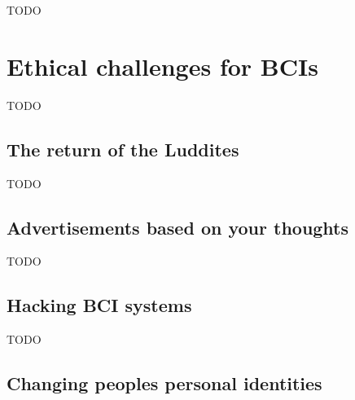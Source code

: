 TODO



\section{Ethical challenges for BCIs}
\label{sec:bci_ethical}

TODO


\subsection{The return of the Luddites}
\label{subsec:bci_ethical_luddites}

TODO


\subsection{Advertisements based on your thoughts}
\label{subsec:bci_ethical_data_mining}

TODO


\subsection{Hacking BCI systems}
\label{subsec:bci_ethical_hacking}

TODO


\subsection{Changing peoples personal identities}
\label{subsec:bci_ethical_identity}

